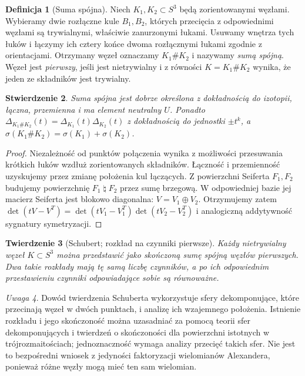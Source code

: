 \documentclass[11pt,a4paper]{report}
\numberwithin{equation}{section}
\theoremstyle{plain}
\newtheorem{twierdzenie}{Twierdzenie}[section]
\newtheorem{stwierdzenie}[twierdzenie]{Stwierdzenie}
\theoremstyle{definition}
\newtheorem{definicja}[twierdzenie]{Definicja}
\theoremstyle{remark}
\newtheorem{uwaga}[twierdzenie]{Uwaga}
\begin{document}
\begin{definicja}[Suma spójna]
Niech $K_1,K_2\subset S^3$ będą zorientowanymi węzłami.
Wybieramy dwie rozłączne kule $B_1,B_2$, których przecięcia
z odpowiednimi węzłami są trywialnymi, właściwie zanurzonymi
łukami. Usuwamy wnętrza tych łuków i łączymy ich cztery końce
dwoma rozłącznymi łukami zgodnie z orientacjami. Otrzymany
węzeł oznaczamy $K_1\#K_2$ i nazywamy \emph{sumą spójną}.
Węzeł jest \emph{pierwszy}, jeśli jest nietrywialny i z równości
$K=K_1\#K_2$ wynika, że jeden ze składników jest trywialny.
\end{definicja}

\begin{stwierdzenie}
Suma spójna jest dobrze określona z dokładnością do izotopii,
łączna, przemienna i ma element neutralny $U$.
Ponadto $\Delta_{K_1\#K_2}(t)=\Delta_{K_1}(t)\Delta_{K_2}(t)$
z dokładnością do jednostki $\pm t^k$, a
$\sigma(K_1\#K_2)=\sigma(K_1)+\sigma(K_2)$.
\end{stwierdzenie}

\begin{proof}
Niezależność od punktów połączenia wynika z możliwości
przesuwania krótkich łuków wzdłuż zorientowanych składników.
Łączność i przemienność uzyskujemy przez zmianę położenia
kul łączących. Z powierzchni Seiferta $F_1,F_2$ budujemy
powierzchnię $F_1\mathbin{\natural}F_2$ przez sumę brzegową.
W odpowiedniej bazie jej macierz Seiferta jest blokowo diagonalna:
$V=V_1\oplus V_2$. Otrzymujemy zatem
$\det(tV-V^T)=\det(tV_1-V_1^T)\det(tV_2-V_2^T)$
i analogiczną addytywność sygnatury symetryzacji.
\end{proof}

\begin{twierdzenie}[Schubert; rozkład na czynniki pierwsze]
Każdy nietrywialny węzeł $K\subset S^3$ można przedstawić
jako skończoną sumę spójną węzłów pierwszych. Dwa takie
rozkłady mają tę samą liczbę czynników, a po ich odpowiednim
przestawieniu czynniki odpowiadające sobie są równoważne.
\end{twierdzenie}

\begin{uwaga}
Dowód twierdzenia Schuberta wykorzystuje sfery dekomponujące,
które przecinają węzeł w dwóch punktach, i analizę ich
wzajemnego położenia. Istnienie rozkładu i jego skończoność można uzasadniać
za pomocą teorii sfer dekomponujących i twierdzeń o skończoności
dla powierzchni istotnych w trójrozmaitościach; jednoznaczność
wymaga analizy przecięć takich sfer. Nie jest to
bezpośredni wniosek z jedyności faktoryzacji wielomianów
Alexandera, ponieważ różne węzły mogą mieć ten sam wielomian.
\end{uwaga}
\end{document}
